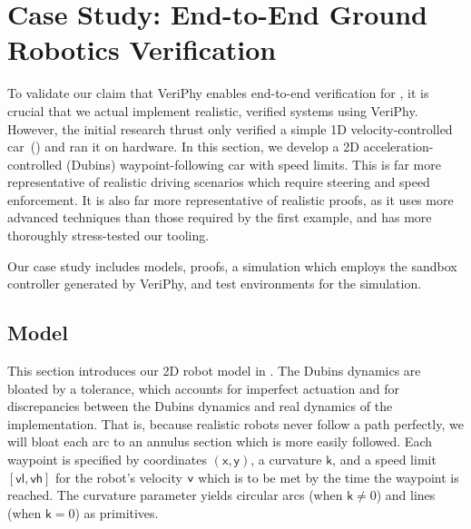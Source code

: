 \documentclass[12pt]{cmuthesis}
\theoremstyle{definition}
\theoremstyle{remark}
\newcommand{\xgvar}{\textsf{x}}
\newcommand{\ygvar}{\textsf{y}}
\newcommand{\kvar}{\textsf{k}}
\newcommand{\vlvar}{\textsf{vl}}
\newcommand{\vhvar}{\textsf{vh}}
\newcommand{\vvar}{{\sf v}\xspace}
\newcommand{\rref}[2][]{\prettyref{#2}}
\newcommand{\VeriPhy}{VeriPhy\xspace}
\begin{document}
\section{Case Study: End-to-End Ground Robotics Verification}
\label{sec:ground-robotics}
To validate our claim that \VeriPhy enables end-to-end verification for \dL, it is crucial that we actual implement realistic, verified systems using \VeriPhy.
However, the initial research thrust only verified a simple 1D velocity-controlled car~(\rref{ex:driving-game}) and ran it on hardware.
In this section, we develop a 2D acceleration-controlled (Dubins) waypoint-following car with speed limits.
This is far more representative of realistic driving scenarios which require steering and speed enforcement.
It is also far more representative of realistic proofs, as it uses more advanced techniques than those required by the first example, and has more thoroughly stress-tested our tooling.

Our case study includes \dL models, proofs, a simulation which employs the sandbox controller generated by \VeriPhy, and test environments for the simulation.

\subsection{Model}
\label{sec:planar-driving-system}
This section introduces our 2D robot model in \dL.
The Dubins dynamics are bloated by a tolerance, which accounts for imperfect actuation and for discrepancies between the Dubins dynamics and real dynamics of the implementation.
That is, because realistic robots never follow a path perfectly, we will bloat each arc to an annulus section which is more easily followed.
Each waypoint is specified by coordinates $(\xgvar,\ygvar)$, a curvature $\kvar$, and a speed limit $[\vlvar,\vhvar]$ for the robot's velocity $\vvar$ which is to be met by the time the waypoint is reached.
The curvature parameter yields circular arcs (when $\kvar \not= 0$) and lines (when $\kvar=0$) as primitives.
\end{document}
